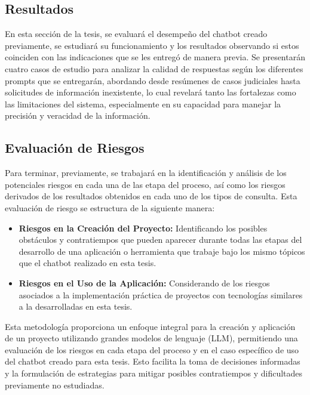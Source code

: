 \newpage

\subsection{Resultados}

En esta sección de la tesis, se evaluará el desempeño del chatbot creado previamente, se estudiará su funcionamiento y los resultados 
observando si estos coinciden con las indicaciones que se les entregó de manera previa. Se presentarán cuatro 
casos de estudio para analizar la calidad de respuestas según los diferentes prompts que se entregarán, abordando desde resúmenes de casos judiciales 
hasta solicitudes de información inexistente, lo cual revelará tanto las fortalezas como las limitaciones del sistema, 
especialmente en su capacidad para manejar la precisión y veracidad de la información.

\subsection{Evaluación de Riesgos}

Para terminar, previamente, se trabajará en la identificación y análisis de los potenciales riesgos  en cada una de las etapa del proceso, así como los riesgos derivados de
los resultados obtenidos en cada uno de los tipos de consulta. Esta evaluación de riesgo se estructura de la siguiente manera:

\begin{itemize}
    \item \textbf{Riesgos en la Creación del Proyecto:} Identificando los posibles obstáculos y contratiempos que pueden aparecer durante todas las etapas del desarrollo de una aplicación o herramienta que trabaje bajo los mismo tópicos que el chatbot realizado en esta tesis.
    \item \textbf{Riesgos en el Uso de la Aplicación:} Considerando de los riesgos asociados a la implementación práctica de proyectos con tecnologías similares a la desarrolladas en esta tesis.
\end{itemize}

Esta metodología proporciona un enfoque integral para la creación y aplicación de un proyecto utilizando grandes modelos de lenguaje (LLM), permitiendo una evaluación de los riesgos en cada etapa del proceso y en el caso específico de uso del chatbot creado para esta tesis. Esto facilita la toma de decisiones informadas y la formulación de estrategias para mitigar posibles contratiempos y dificultades previamente no estudiadas.

